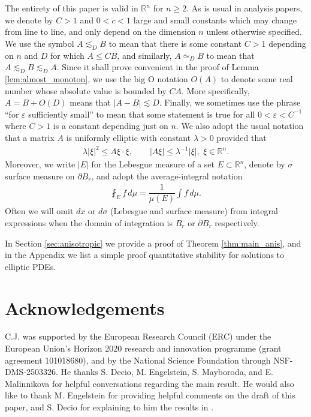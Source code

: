 \documentclass[12pt,leqno]{amsart}
\numberwithin{equation}{section}
\theoremstyle{definition}
\newcommand{\R}{\mathbb{R}}
\renewcommand{\epsilon}{\varepsilon}
\newcommand{\abs}[1]{\left \lvert #1 \right \rvert}
\newcommand{\nocontentsline}[3]{}
\let\origcontentsline\addcontentsline
\newcommand\stoptoc{\let\addcontentsline\nocontentsline}
\newcommand\resumetoc{\let\addcontentsline\origcontentsline}
\begin{document}
The entirety of this paper is valid in $\R^n$ for $n \ge 2$. As is usual in analysis papers, we denote by $C > 1$ and $ 0 < c < 1$ large and small constants which may change from line to line, and only depend on the dimension $n$ unless otherwise specified. We use the symbol $A \lesssim_D B$ to mean that there is some constant $C > 1$ depending on $n$ and $D$ for which $A \le C B$, and similarly, $A \simeq_D B$ to mean that $A \lesssim_D B \lesssim_D A$.  Since it shall prove convenient in the proof of Lemma \ref{lem:almost_monoton}, we use the big O notation $O(A)$ to denote some real number whose absolute value is bounded by $CA$. More specifically, $A = B + O(D)$ means that $\abs{A - B} \lesssim D$. Finally, we sometimes use the phrase ``for $\epsilon$ sufficiently small'' to mean that some statement is true for all $0 < \epsilon < C^{-1}$ where $C >1 $ is a constant depending just on $n$. We also adopt the usual notation that a matrix $A$ is uniformly elliptic with constant $\lambda  >0$ provided that 
\begin{align*}
	\lambda \abs{\xi}^2 \le A \xi \cdot \xi, \qquad \abs{A \xi} \le \lambda^{-1} \abs{\xi}, \, \, \xi \in \R^n. 
\end{align*}
Moreover, we write $\abs{E}$ for the Lebesgue measure of a set $E \subset \R^n$, denote by $\sigma$ surface measure on $\partial B_r$, and adopt the average-integral notation
\begin{align*}
	\fint_E f \, d\mu = \dfrac{1}{\mu(E)} \int f \, d\mu.
\end{align*}
Often we will omit $dx$ or $d\sigma$ (Lebesgue and surface measure) from integral expressions when the domain of integration is $B_r$ or $\partial B_r$ respectively. 

In Section \ref{sec:anisotropic} we provide a proof of Theorem \ref{thm:main_anis}, and in the Appendix we list a simple proof quantitative stability for solutions to elliptic PDEs.

\stoptoc
\section*{Acknowledgements} 
C.J. was supported by the European Research Council (ERC) under the European Union's Horizon 2020 research and innovation programme (grant agreement 101018680), and by the National Science Foundation through NSF-DMS-2503326. He thanks S. Decio, M. Engelstein, S. Mayboroda, and E. Malinnikova for helpful conversations regarding the main result. He would also like to thank M. Engelstein for providing helpful comments on the draft of this paper, and S. Decio for explaining to him the results in \cite{MS69}.
\resumetoc
\end{document}
